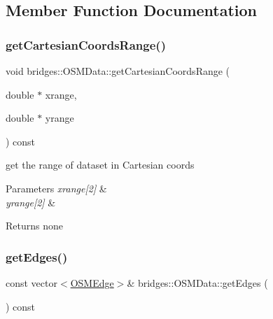 \subsection{Member Function Documentation}
\mbox{\label{classbridges_1_1_o_s_m_data_ade3af326972e31ce991798e800fbbd5b}} 
\subsubsection{\texorpdfstring{getCartesianCoordsRange()}{getCartesianCoordsRange()}}
{\footnotesize\ttfamily void bridges\+::\+O\+S\+M\+Data\+::get\+Cartesian\+Coords\+Range (\begin{DoxyParamCaption}\item[{double $\ast$}]{xrange,  }\item[{double $\ast$}]{yrange }\end{DoxyParamCaption}) const\hspace{0.3cm}{\ttfamily [inline]}}

get the range of dataset in Cartesian coords


\begin{DoxyParams}{Parameters}
{\em xrange\mbox{[}2\mbox{]}} & \\
\hline
{\em yrange\mbox{[}2\mbox{]}} & \\
\hline
\end{DoxyParams}
\begin{DoxyReturn}{Returns}
none 
\end{DoxyReturn}
\mbox{\label{classbridges_1_1_o_s_m_data_a0a226c840f69547f5d4e53dd7d4ef5d3}} 
\subsubsection{\texorpdfstring{getEdges()}{getEdges()}}
{\footnotesize\ttfamily const vector$<$\mbox{\hyperlink{classbridges_1_1_o_s_m_edge}{O\+S\+M\+Edge}}$>$\& bridges\+::\+O\+S\+M\+Data\+::get\+Edges (\begin{DoxyParamCaption}{ }\end{DoxyParamCaption}) const\hspace{0.3cm}{\ttfamily [inline]}}

